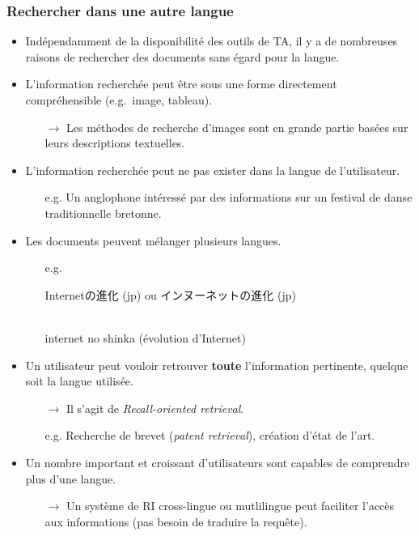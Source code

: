 \documentclass[12pt,aspectratio=43,dvipsnames,table]{beamer}
\begin{document}
\begin{frame}[allowframebreaks]
    \frametitle{Rechercher dans une autre langue}
    \begin{itemize} \itemsep10pt
        \item Indépendamment de la disponibilité des outils de TA, il y a 
              de nombreuses raisons de rechercher des documents sans égard pour 
              la langue.
        \item L'information recherchée peut être sous une forme directement 
              compréhensible (e.g.~image, tableau).
        \begin{itemize}
              \item[$\to$] Les méthodes de recherche d'images sont en grande 
              partie basées sur leurs descriptions textuelles.
        \end{itemize}
        \item L'information recherchée peut ne pas exister dans la langue de 
              l'utilisateur.
        \begin{itemize}
              \item[e.g.] Un anglophone intéressé par des informations sur un 
                    festival de danse traditionnelle bretonne.
        \end{itemize}
        
        \framebreak
        
        \item Les documents peuvent mélanger plusieurs langues.
        \begin{itemize}
          \item[e.g.] \begin{CJK}{UTF8}{min}
                      Internetの進化 (jp) ou インヌーネットの進化 (jp)
                      \end{CJK} \\
                      internet no shinka (évolution d'Internet)
        \end{itemize}
        \item Un utilisateur peut vouloir retrouver \textbf{toute} l'information
              pertinente, quelque soit la langue utilisée.
        \begin{itemize}
        \item[$\to$] Il s'agit de \textit{Recall-oriented retrieval}.
        \item[e.g.] Recherche de brevet (\textit{patent retrieval}), création 
                    d'état de l'art.
        \end{itemize}
        \item Un nombre important et croissant d'utilisateurs sont capables de 
              comprendre plus d'une langue.
        \begin{itemize}
        \item[$\to$] Un système de RI cross-lingue ou mutlilingue peut faciliter
                    l'accès aux informations (pas besoin de traduire la requête).
        \end{itemize}
    \end{itemize}
\end{frame}
\end{document}
